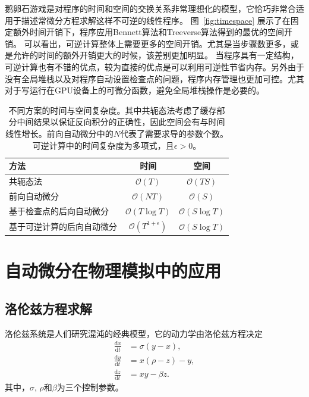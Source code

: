 \documentclass[A4,twoside,fontset=ubuntu,UTF8]{ctexart}
\def\D{\mathrm{d}}
\newcommand{\bigO}{{\mathcal{O}}}
\begin{document}

鹅卵石游戏是对程序的时间和空间的交换关系非常理想化的模型，它恰巧非常合适用于描述常微分方程求解这样不可逆的线性程序。
图~\ref{fig:timespace} 展示了在固定额外时间开销下，程序应用Bennett算法和Treeverse算法得到的最优的空间开销。
可以看出，可逆计算整体上需要更多的空间开销。尤其是当步骤数更多，或是允许的时间的额外开销更大的时候，该差别更加明显。
当程序具有一定结构，可逆计算也有不错的优点，较为直接的优点是可以利用可逆性节省内存。另外由于没有全局堆栈以及对程序自动设置检查点的问题，程序内存管理也更加可控。尤其对于写运行在GPU设备上的可微分函数，避免全局堆栈操作是必要的。

\begin{table}\centering
    \begin{tabularx}{0.7\textwidth}{Xcc}\toprule
        \textbf{方法} & 时间 & 空间\\
        \hline
        共轭态法                     &  $\bigO(T)$          & $\bigO(TS)$\\
        前向自动微分                 &  $\bigO(NT)$         & $\bigO(S)$  \\
        基于检查点的后向自动微分     &  $\bigO(T\log T)$    & $\bigO(S\log T)$   \\
        基于可逆计算的后向自动微分   &  $\bigO(T^{1+\epsilon})$ & $\bigO(S\log T)$ \\
        \bottomrule
    \end{tabularx}
    \caption{不同方案的时间与空间复杂度。其中共轭态法考虑了缓存部分中间结果以保证反向积分的正确性，因此空间会有与时间线性增长。前向自动微分中的$N$代表了需要求导的参数个数。可逆计算中的时间复杂度为多项式，且$\epsilon > 0$。}\label{tbl:complexity}
\end{table}

\section{自动微分在物理模拟中的应用}\label{sec:applications}

\subsection{洛伦兹方程求解}
洛伦兹系统是人们研究混沌的经典模型，它的动力学由洛伦兹方程决定
\begin{align*}
    \frac{\D x}{\D t} &= \sigma(y - x),\\
    \frac{\D y}{\D t} &= x(\rho -z) - y,\\
    \frac{\D z}{\D t} &= xy-\beta z.
\end{align*}
其中，$\sigma$, $\rho$和$\beta$为三个控制参数。
\end{document}
